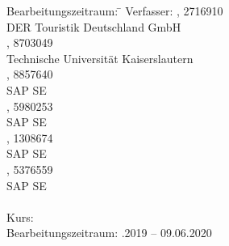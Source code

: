 \begin{titlepage}
\begin{center}
\begin{minipage}{\textwidth}
		\begin{tabbing}
			Bearbeitungszeitraum: \hspace{0.85cm}\=\kill
			Verfasser: \> \authorSG, 2716910 \\
			\> DER Touristik Deutschland GmbH \\[3mm]
			\> \authorRF, 8703049 \\
			\> Technische Universität Kaiserslautern \\[3mm]
			\> \authorMS, 8857640 \\
			\> SAP SE \\[3mm]
			\> \authorEJ, 5980253 \\
			\> SAP SE \\[3mm]
			\> \authorNL, 1308674 \\
			\> SAP SE \\[3mm]
			\> \authorJR, 5376559 \\
			\> SAP SE \\
			\> \\[1.5mm]
			Kurs: \> \DieKursbezeichnung \\[1.5mm]
			Bearbeitungszeitraum: .2019 -- 09.06.2020
	\end{tabbing}

	\end{minipage}

\end{center}

\end{titlepage}
